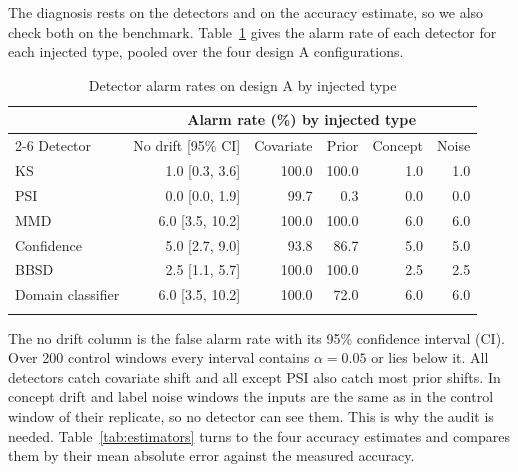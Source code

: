 \documentclass[pdflatex,referee,lineno,sn-basic]{sn-jnl}
\begin{document}
The diagnosis rests on the detectors and on the accuracy estimate, so we also check both on the benchmark. Table~\ref{tab:detectors} gives the alarm rate of each detector for each injected type, pooled over the four design A configurations.

\begin{table}[!htbp]\centering\tablebodyfont
\caption{Detector alarm rates on design A by injected type}\label{tab:detectors}%
\begin{tabular}{@{}lrrrrr@{}}
\toprule
 & \multicolumn{5}{c}{Alarm rate (\%) by injected type} \\
\cmidrule(lr){2-6}
Detector & \multicolumn{1}{c}{No drift [95\% CI]} & \multicolumn{1}{c}{Covariate} & \multicolumn{1}{c}{Prior} & \multicolumn{1}{c}{Concept} & \multicolumn{1}{c}{Noise} \\
\midrule
KS & 1.0 [0.3, 3.6] & 100.0 & 100.0 & 1.0 & 1.0 \\
PSI & 0.0 [0.0, 1.9] & 99.7 & 0.3 & 0.0 & 0.0 \\
MMD & 6.0 [3.5, 10.2] & 100.0 & 100.0 & 6.0 & 6.0 \\
Confidence & 5.0 [2.7, 9.0] & 93.8 & 86.7 & 5.0 & 5.0 \\
BBSD & 2.5 [1.1, 5.7] & 100.0 & 100.0 & 2.5 & 2.5 \\
Domain classifier & 6.0 [3.5, 10.2] & 100.0 & 72.0 & 6.0 & 6.0 \\
\botrule
\end{tabular}
\end{table}

The no drift column is the false alarm rate with its 95\% confidence interval (CI). Over 200 control windows every interval contains $\alpha=0.05$ or lies below it. All detectors catch covariate shift and all except PSI also catch most prior shifts. In concept drift and label noise windows the inputs are the same as in the control window of their replicate, so no detector can see them. This is why the audit is needed. Table~\ref{tab:estimators} turns to the four accuracy estimates and compares them by their mean absolute error against the measured accuracy.
\end{document}

